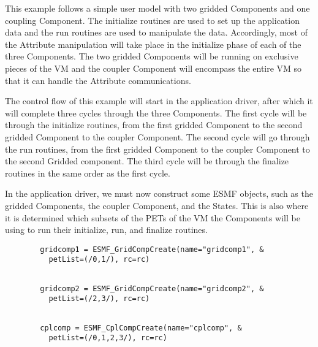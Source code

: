    This example follows a simple user model with two gridded Components and one coupling Component.
   The initialize routines are used to set up the application data and the run
   routines are used to manipulate the data.  Accordingly, most of the Attribute manipulation
   will take place in the initialize phase of each of the three Components.  The two gridded
   Components will be running on exclusive pieces of the VM and the coupler Component will
   encompass the entire VM so that it can handle the Attribute communications.
  
   The control flow of this
   example will start in the application driver, after which it will complete three cycles
   through the three Components.  The first cycle will be through the initialize routines,
   from the first gridded Component to the second gridded Component to the coupler Component.  The
   second cycle will go through the run routines, from the first gridded Component to the
   coupler Component to the second Gridded component.  The third cycle will be through the
   finalize routines in the same order as the first cycle.
   

   In the application driver, we must now construct some ESMF objects,
   such as the gridded Components, the coupler Component, and the States.  This
   is also where it is determined which subsets of the PETs of the VM the
   Components will be using to run their initialize, run, and finalize routines. 

 \begin{verbatim}
        gridcomp1 = ESMF_GridCompCreate(name="gridcomp1", &
          petList=(/0,1/), rc=rc)
 
\end{verbatim}
 

 \begin{verbatim}
        gridcomp2 = ESMF_GridCompCreate(name="gridcomp2", &
          petList=(/2,3/), rc=rc)
 
\end{verbatim}
 

 \begin{verbatim}
        cplcomp = ESMF_CplCompCreate(name="cplcomp", &
          petList=(/0,1,2,3/), rc=rc)
 
\end{verbatim}
 
